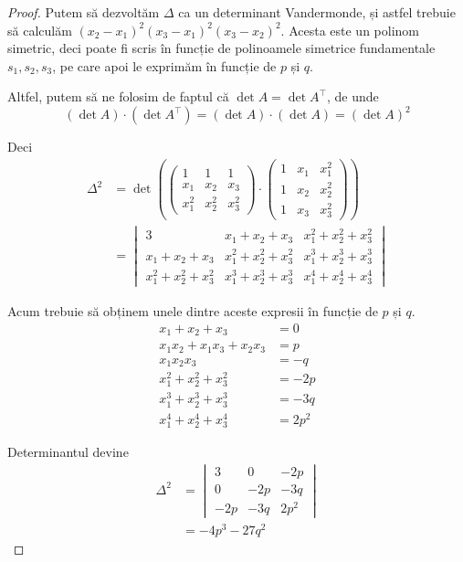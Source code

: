 \begin{proof}
Putem să dezvoltăm \(\Delta\) ca un determinant Vandermonde, și astfel trebuie să calculăm \((x_2 - x_1)^2 (x_3 - x_1)^2 (x_3 - x_2)^2\). Acesta este un polinom simetric, deci poate fi scris în funcție de polinoamele simetrice fundamentale \(s_1, s_2, s_3\), pe care apoi le exprimăm în funcție de \(p\) și \(q\).

Altfel, putem să ne folosim de faptul că \(\det A = \det A^\intercal\), de unde
\[
    (\det A) \cdot (\det A^\intercal) = (\det A) \cdot (\det A) = (\det A)^2
\]

Deci
\begin{align*}
    \Delta^2 &= \det \left(
    \begin{pmatrix}
        1 & 1 & 1 \\
        x_1 & x_2 & x_3 \\
        x_1^2 & x_2^2 & x_3^2
    \end{pmatrix}
    \cdot
    \begin{pmatrix}
        1 & x_1 & x_1^2 \\
        1 & x_2 & x_2^2 \\
        1 & x_3 & x_3^2
    \end{pmatrix}
    \right) \\
    &= \begin{vmatrix}
    3 & x_1 + x_2 + x_3 & x_1^2 + x_2^2 + x_3^2 \\
    x_1 + x_2 + x_3 & x_1^2 + x_2^2 + x_3^2 & x_1^3 + x_2^3 + x_3^3 \\
    x_1^2 + x_2^2 + x_3^2 & x_1^3 + x_2^3 + x_3^3 & x_1^4 + x_2^4 + x_3^4
    \end{vmatrix}
\end{align*}

Acum trebuie să obținem unele dintre aceste expresii în funcție de \(p\) și \(q\).
\begin{align*}
    x_1 + x_2 + x_3 &= 0 \\
    x_1 x_2 + x_1 x_3 + x_2 x_3 &= p \\
    x_1 x_2 x_3 &= -q \\
    x_1^2 + x_2^2 + x_3^2 &= -2p \\
    x_1^3 + x_2^3 + x_3^3 &= -3q \\ 
    x_1^4 + x_2^4 + x_3^4 &= 2p^2
\end{align*}

Determinantul devine
\begin{align*}
    \Delta^2 &= \begin{vmatrix}
        3 & 0 & -2p \\
        0 & -2p & -3q \\
        -2p & -3q & 2p^2
    \end{vmatrix} \\
    &= -4p^3 - 27q^2
\end{align*}
\end{proof}

